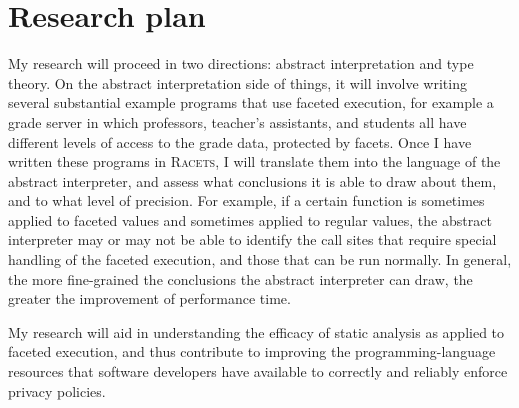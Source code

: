 \documentclass{article}
\begin{document}
\section{Research plan}
My research will proceed in two directions: abstract interpretation and type theory. On the abstract interpretation side of things, it will involve writing several substantial example programs that use faceted execution, for example a grade server in which professors, teacher's assistants, and students all have different levels of access to the grade data, protected by facets. Once I have written these programs in \textsc{Racets}, I will translate them into the language of the abstract interpreter, and assess what conclusions it is able to draw about them, and to what level of precision. For example, if a certain function is sometimes applied to faceted values and sometimes applied to regular values, the abstract interpreter may or may not be able to identify the call sites that require special handling of the faceted execution, and those that can be run normally. In general, the more fine-grained the conclusions the abstract interpreter can draw, the greater the improvement of performance time.

My research will aid in understanding the efficacy of static analysis as applied to faceted execution, and thus contribute to improving the programming-language resources that software developers have available to correctly and reliably enforce privacy policies.


\end{document}

